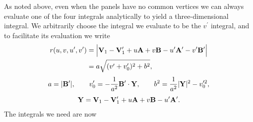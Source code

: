 \documentclass[letterpaper]{article}
\begin{document}
As noted above, even when the panels have no common vertices
we can always evaluate one of the four integrals 
analytically to yield a three-dimensional integral.
We arbitrarily choose the integral we evaluate to be
the $v^\prime$ integral, and to facilitate its evaluation we 
write
\begin{align*}
r(u,v,u^\prime,v^\prime)
&=\Big| \mathbf{V}_1 - \mathbf{V}_1^\prime
       + u\mathbf{A} + v\mathbf{B} - u^\prime\mathbf{A}^\prime - v^\prime\mathbf{B}^\prime
  \Big|   
\\
&=a \sqrt{ (v^\prime + v_0^\prime)^2 + b^2 },
\end{align*}
$$
a = |\mathbf{B}^\prime|, 
\qquad
v_0^\prime = -\frac{1}{a^2} \mathbf{B}^\prime \cdot \mathbf{Y},
\qquad
b^2=\frac{1}{a^2}|\mathbf{Y}|^2 - v_0^{\prime 2},
$$
$$
\mathbf{Y}=    \mathbf{V}_1 - \mathbf{V}_1^\prime  
       + u\mathbf{A}+ v\mathbf{B} - u^\prime\mathbf{A}^\prime.
$$
The integrals we need are now
\end{document}
